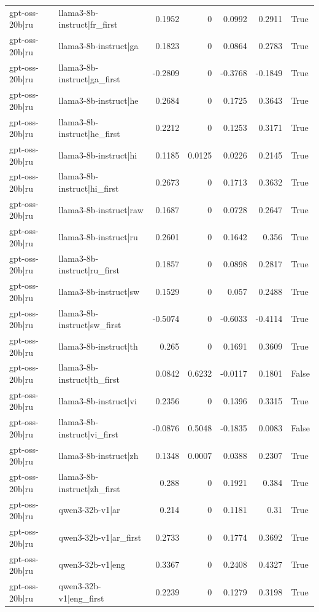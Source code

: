 \begin{table}
\begin{tabular}{l l r r r r l}
gpt-oss-20b|ru & llama3-8b-instruct|fr_first & 0.1952 & 0 & 0.0992 & 0.2911 & True \\
gpt-oss-20b|ru & llama3-8b-instruct|ga & 0.1823 & 0 & 0.0864 & 0.2783 & True \\
gpt-oss-20b|ru & llama3-8b-instruct|ga_first & -0.2809 & 0 & -0.3768 & -0.1849 & True \\
gpt-oss-20b|ru & llama3-8b-instruct|he & 0.2684 & 0 & 0.1725 & 0.3643 & True \\
gpt-oss-20b|ru & llama3-8b-instruct|he_first & 0.2212 & 0 & 0.1253 & 0.3171 & True \\
gpt-oss-20b|ru & llama3-8b-instruct|hi & 0.1185 & 0.0125 & 0.0226 & 0.2145 & True \\
gpt-oss-20b|ru & llama3-8b-instruct|hi_first & 0.2673 & 0 & 0.1713 & 0.3632 & True \\
gpt-oss-20b|ru & llama3-8b-instruct|raw & 0.1687 & 0 & 0.0728 & 0.2647 & True \\
gpt-oss-20b|ru & llama3-8b-instruct|ru & 0.2601 & 0 & 0.1642 & 0.356 & True \\
gpt-oss-20b|ru & llama3-8b-instruct|ru_first & 0.1857 & 0 & 0.0898 & 0.2817 & True \\
gpt-oss-20b|ru & llama3-8b-instruct|sw & 0.1529 & 0 & 0.057 & 0.2488 & True \\
gpt-oss-20b|ru & llama3-8b-instruct|sw_first & -0.5074 & 0 & -0.6033 & -0.4114 & True \\
gpt-oss-20b|ru & llama3-8b-instruct|th & 0.265 & 0 & 0.1691 & 0.3609 & True \\
gpt-oss-20b|ru & llama3-8b-instruct|th_first & 0.0842 & 0.6232 & -0.0117 & 0.1801 & False \\
gpt-oss-20b|ru & llama3-8b-instruct|vi & 0.2356 & 0 & 0.1396 & 0.3315 & True \\
gpt-oss-20b|ru & llama3-8b-instruct|vi_first & -0.0876 & 0.5048 & -0.1835 & 0.0083 & False \\
gpt-oss-20b|ru & llama3-8b-instruct|zh & 0.1348 & 0.0007 & 0.0388 & 0.2307 & True \\
gpt-oss-20b|ru & llama3-8b-instruct|zh_first & 0.288 & 0 & 0.1921 & 0.384 & True \\
gpt-oss-20b|ru & qwen3-32b-v1|ar & 0.214 & 0 & 0.1181 & 0.31 & True \\
gpt-oss-20b|ru & qwen3-32b-v1|ar_first & 0.2733 & 0 & 0.1774 & 0.3692 & True \\
gpt-oss-20b|ru & qwen3-32b-v1|eng & 0.3367 & 0 & 0.2408 & 0.4327 & True \\
gpt-oss-20b|ru & qwen3-32b-v1|eng_first & 0.2239 & 0 & 0.1279 & 0.3198 & True \\

\end{tabular}
\end{table}
